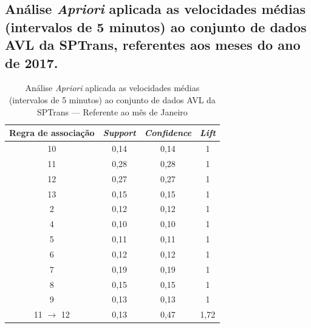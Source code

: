 \documentclass[
	12pt,				%
	oneside,			%
	a4paper,			%
	english,			%
	brazil				%
	]{abntex2ppgsi}
\begin{document}
{{{\begin{apendicesenv}
\section{Análise \textit{Apriori} aplicada as velocidades médias (intervalos de 5 minutos) ao conjunto de dados AVL da SPTrans, referentes aos meses do ano de 2017.}
\label{g1}

\begin{table}[!htb]
\centering
\caption {Análise \textit{Apriori} aplicada as velocidades médias (intervalos de 5 minutos) ao conjunto de dados AVL da SPTrans --- Referente ao mês de Janeiro}
\label {tab:aprioriJanuary}
\begin{tabular}{c|c|c|c}
\toprule
\textbf{Regra de associação} & \textit{\textbf{Support}} & \textit{\textbf{Confidence}} & \textit{\textbf{Lift}} \\
\midrule
10 &  0,14 &  0,14 &  1\\
\hline
11 &  0,28 &  0,28 &  1\\
\hline
12 &  0,27 &  0,27 &  1\\
\hline
13 &  0,15 &  0,15 &  1\\
\hline
2 &  0,12 &  0,12&  1\\
\hline
4 &  0,10&  0,10 &  1\\
\hline
5 &  0,11 &  0,11 &  1\\
\hline
6 &  0,12 &  0,12 &  1\\
\hline
7 &  0,19 &  0,19 &  1\\
\hline
8 &  0,15 &  0,15&  1\\
\hline
9 &  0,13 &  0,13 &  1\\
\hline
11 $\rightarrow$ 12 &  0,13 &  0,47&  1,72\\
\bottomrule
\end{tabular}
\end{table}


\end{apendicesenv}}}}
\end{document}
